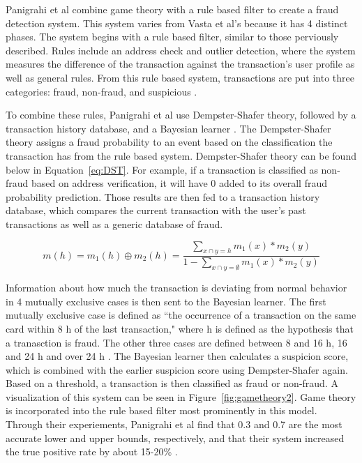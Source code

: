 \documentclass[midd]{thesis}
\begin{document}
Panigrahi et al combine game theory with a rule based filter to create a fraud detection system. This system varies from Vasta et al's because it has 4 distinct phases. The system begins with a rule based filter, similar to those perviously described. Rules include an address check and outlier detection, where the system measures the difference of the transaction against the transaction's user profile as well as general rules. From this rule based system, transactions are put into three categories: fraud, non-fraud, and suspicious \cite{Panigrahi2009}. 

To combine these rules, Panigrahi et al use Dempster-Shafer theory, followed by a transaction history database, and a Bayesian learner \cite{Panigrahi2009}. The Dempster-Shafer theory assigns a fraud probability to an event based on the classification the transaction has from the rule based system. Dempster-Shafer theory can be found below in Equation~\ref{eq:DST}.  For example, if a transaction is classified as non-fraud based on address verification, it will have 0 added to its overall fraud probability prediction. Those results are then fed to a transaction history database, which compares the current transaction with the user's past transactions as well as a generic database of fraud. 

\begin{equation}
\label{eq:DST}
m(h) = m_{1}(h)\oplus m_{2}(h) = {\frac {\sum _{x\cap y=h}m_{1}(x) * m_{2}(y)} {1 - \sum _{x\cap y=\emptyset }m_{1}(x) * m_{2}(y) }}
\end{equation}


Information about how much the transaction is deviating from normal behavior in 4 mutually exclusive cases is then sent to the Bayesian learner. The first mutually exclusive case is defined as ``the occurrence of a transaction on the same card within 8 h of the last transaction," where h is defined as the hypothesis that a tranasction is fraud. The other three cases are defined between 8 and 16 h, 16 and 24 h and over 24 h \cite{Panigrahi2009}.  The Bayesian learner then calculates a suspicion score, which is combined with the earlier suspicion score using Dempster-Shafer again. Based on a threshold, a transaction is then classified as fraud or non-fraud. A visualization of this system can be seen in Figure~\ref{fig:gametheory2}. Game theory is incorporated into the rule based filter most prominently in this model. Through their experiements, Panigrahi et al find that 0.3 and 0.7 are the most accurate lower and upper bounds, respectively, and that their system increased the true positive rate by about 15-20\% \cite{Panigrahi2009}. 
\end{document}
